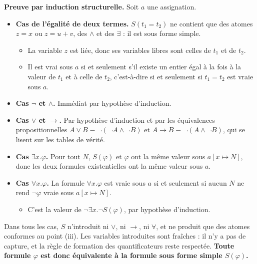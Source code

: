 \documentclass[11pt,a4paper]{article}
\providecommand{\tightlist}{\setlength{\itemsep}{0pt}\setlength{\parskip}{0pt}}
\begin{document}
\textbf{Preuve par induction structurelle.} Soit \(a\) une assignation.

\begin{itemize}
\tightlist
\item
  \textbf{Cas de l'égalité de deux termes.} \(S(t_1=t_2)\) ne contient que des atomes \(z=x\) ou \(z=u+v\), des \(\wedge\) et des \(\exists\) : il est sous forme simple.

  \begin{itemize}
  \tightlist
  \item
    La variable \(z\) est liée, donc ses variables libres sont celles de \(t_1\) et de \(t_2\).
  \item
    Il est vrai sous \(a\) si et seulement s'il existe un entier égal à la fois à la valeur de \(t_1\) et à celle de \(t_2\), c'est-à-dire si et seulement si \(t_1=t_2\) est vraie sous \(a\).
  \end{itemize}
\item
  \textbf{Cas \(\neg\) et \(\wedge\).} Immédiat par hypothèse d'induction.
\item
  \textbf{Cas \(\vee\) et \(\to\).} Par hypothèse d'induction et par les équivalences propositionnelles \(A\vee B\equiv\neg(\neg A\wedge\neg B)\) et \(A\to B\equiv\neg(A\wedge\neg B)\), qui se lisent sur les tables de vérité.
\item
  \textbf{Cas \(\exists x.\varphi\).} Pour tout \(N\), \(S(\varphi)\) et \(\varphi\) ont la même valeur sous \(a[x\mapsto N]\), donc les deux formules existentielles ont la même valeur sous \(a\).
\item
  \textbf{Cas \(\forall x.\varphi\).} La formule \(\forall x.\varphi\) est vraie sous \(a\) si et seulement si aucun \(N\) ne rend \(\neg\varphi\) vraie sous \(a[x\mapsto N]\).

  \begin{itemize}
  \tightlist
  \item
    C'est la valeur de \(\neg\exists x.\neg S(\varphi)\), par hypothèse d'induction.
  \end{itemize}
\end{itemize}

Dans tous les cas, \(S\) n'introduit ni \(\vee\), ni \(\to\), ni \(\forall\), et ne produit que des atomes conformes au point (iii). Les variables introduites sont fraîches : il n'y a pas de capture, et la règle de formation des quantificateurs reste respectée. \textbf{Toute formule \(\varphi\) est donc équivalente à la formule sous forme simple \(S(\varphi)\).}
\end{document}
